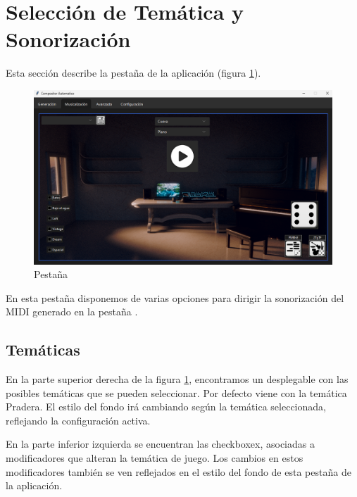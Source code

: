 \section{Selección de Temática y Sonorización}
\label{sec:SeleccionTematica}

Esta sección describe la pestaña \tematicTabName{} de la aplicación (figura \ref{fig:tematicTab}). 

\begin{figure}[h]
    \begin{center}
        \includegraphics[scale=0.45]{Imagenes/Bitmap/tematicTab.png}
    \end{center}
    \caption{Pestaña \tematicTabName{}}
    \label{fig:tematicTab}
\end{figure}

En esta pestaña disponemos de varias opciones para dirigir la sonorización del MIDI generado en la pestaña .

\subsection{Temáticas}
\label{subsec:app:themes}
En la parte superior derecha de la figura \ref{fig:tematicTab}, encontramos un desplegable con las posibles temáticas que se pueden seleccionar. Por defecto viene con la temática Pradera. El estilo del fondo irá cambiando según la temática seleccionada, reflejando la configuración activa. 

En la parte inferior izquierda se encuentran las checkboxex, asociadas a modificadores que alteran la temática de juego. Los cambios en estos modificadores también se ven reflejados en el estilo del fondo de esta pestaña de la aplicación.

